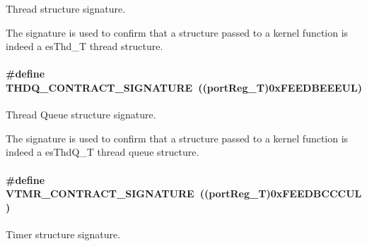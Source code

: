 Thread structure signature. 

The signature is used to confirm that a structure passed to a kernel function is indeed a es\-Thd\-\_\-\-T thread structure. \hypertarget{group__kern__impl_ga756c92b6edae711c63d57f634a5b09f8}{
\paragraph[{T\-H\-D\-Q\-\_\-\-C\-O\-N\-T\-R\-A\-C\-T\-\_\-\-S\-I\-G\-N\-A\-T\-U\-R\-E}]{\setlength{\rightskip}{0pt plus 5cm}\#define T\-H\-D\-Q\-\_\-\-C\-O\-N\-T\-R\-A\-C\-T\-\_\-\-S\-I\-G\-N\-A\-T\-U\-R\-E~(({\bf port\-Reg\-\_\-\-T})0x\-F\-E\-E\-D\-B\-E\-E\-E\-U\-L)}}\label{group__kern__impl_ga756c92b6edae711c63d57f634a5b09f8}


Thread Queue structure signature. 

The signature is used to confirm that a structure passed to a kernel function is indeed a es\-Thd\-Q\-\_\-\-T thread queue structure. \hypertarget{group__kern__impl_ga8b83b7d73295898ffe900f8f37dcb3a9}{
\paragraph[{V\-T\-M\-R\-\_\-\-C\-O\-N\-T\-R\-A\-C\-T\-\_\-\-S\-I\-G\-N\-A\-T\-U\-R\-E}]{\setlength{\rightskip}{0pt plus 5cm}\#define V\-T\-M\-R\-\_\-\-C\-O\-N\-T\-R\-A\-C\-T\-\_\-\-S\-I\-G\-N\-A\-T\-U\-R\-E~(({\bf port\-Reg\-\_\-\-T})0x\-F\-E\-E\-D\-B\-C\-C\-C\-U\-L)}}\label{group__kern__impl_ga8b83b7d73295898ffe900f8f37dcb3a9}


Timer structure signature. 

